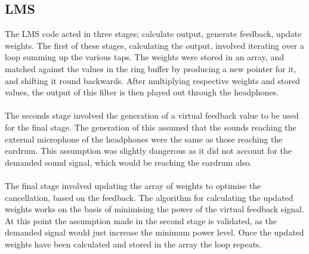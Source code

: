 \subsection{LMS}
\label{ssec:implelms}
The LMS code acted in three stages; calculate output, generate feedback, update weights.
The first of these stages, calculating the output, involved iterating over a loop summing up the various taps.
The weights were stored in an array, and matched against the values in the ring buffer by producing a new pointer for it, and shifting it round backwards.
After multiplying respective weights and stored values, the output of this filter is then played out through the headphones.
\\
\\
The seconds stage involved the generation of a virtual feedback value to be used for the final stage.
The generation of this assumed that the sounds reaching the external microphone of the headphones were the same as those reaching the eardrum.
This assumption was slightly dangerous as it did not account for the demanded sound signal, which would be reaching the eardrum also.
\\
\\
The final stage involved updating the array of weights to optimise the cancellation, based on the feedback.
The algorithm for calculating the updated weights works on the basis of minimising the power of the virtual feedback signal.
At this point the assumption made in the second stage is validated, as the demanded signal would just increase the minimum power level.
Once the updated weights have been calculated and stored in the array the loop repeats.
